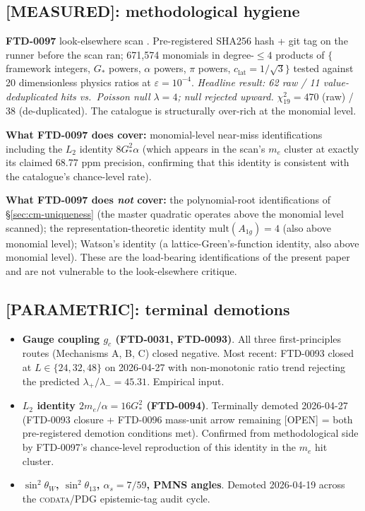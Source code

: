 \documentclass[11pt,reqno]{amsart}
\theoremstyle{plain}
\theoremstyle{definition}
\theoremstyle{remark}
\numberwithin{equation}{section}
\newcommand{\Aoneg}{A_{1g}}
\newcommand{\Gstar}{G_{\!*}}
\begin{document}
\subsection{[MEASURED]: methodological hygiene}

\textbf{FTD-0097} look-elsewhere scan \cite{lookelsewhere}.
Pre-registered SHA256 hash + git tag on the runner before the scan
ran; 671{,}574 monomials in degree-$\leq 4$ products of
$\{$framework integers, $\Gstar$ powers, $\alpha$ powers, $\pi$
powers, $c_{\mathrm{lat}} = 1/\sqrt{3}\}$ tested against 20
dimensionless physics ratios at $\varepsilon = 10^{-4}$.
\emph{Headline result: 62 raw / 11 value-deduplicated hits vs.\
Poisson null $\lambda = 4$; null rejected upward.} $\chi^{2}_{19}
= 470$ (raw) / 38 (de-duplicated). The catalogue is structurally
over-rich at the monomial level.

\textbf{What FTD-0097 does cover:} monomial-level near-miss
identifications including the $L_{2}$ identity
$8\Gstar^{2}\alpha$ (which appears in the scan's $m_e$ cluster
at exactly its claimed 68.77 ppm precision, confirming that this
identity is consistent with the catalogue's chance-level rate).

\textbf{What FTD-0097 does \emph{not} cover:} the polynomial-root
identifications of \S\ref{sec:cm-uniqueness} (the master quadratic
operates above the monomial level scanned); the
representation-theoretic identity $\mathrm{mult}(\Aoneg) = 4$ (also
above monomial level); Watson's identity (a lattice-Green's-function
identity, also above monomial level). These are the load-bearing
identifications of the present paper and are not vulnerable to the
look-elsewhere critique.

\subsection{[PARAMETRIC]: terminal demotions}

\begin{itemize}
\item \textbf{Gauge coupling $g_c$ (FTD-0031, FTD-0093)}. All three
first-principles routes (Mechanisms A, B, C) closed negative. Most
recent: FTD-0093 closed at $L \in \{24, 32, 48\}$ on 2026-04-27 with
non-monotonic ratio trend rejecting the predicted
$\lambda_+/\lambda_- = 45.31$. Empirical input.
\item \textbf{$L_{2}$ identity $2 m_{e}/\alpha = 16\Gstar^{2}$
(FTD-0094)}. Terminally demoted 2026-04-27 (FTD-0093 closure +
FTD-0096 mass-unit arrow remaining [OPEN] = both pre-registered
demotion conditions met). Confirmed from methodological side by
FTD-0097's chance-level reproduction of this identity in the $m_e$
hit cluster.
\item \textbf{$\sin^{2}\theta_{W}$, $\sin^{2}\theta_{13}$,
$\alpha_s = 7/59$, PMNS angles}. Demoted 2026-04-19 across the
\textsc{codata}/PDG epistemic-tag audit cycle.
\end{itemize}
\end{document}
